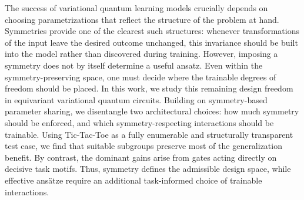 The success of variational quantum learning models crucially depends on choosing parametrizations that reflect the structure of the problem at hand. Symmetries provide one of the clearest such structures: whenever transformations of the input leave the desired outcome unchanged, this invariance should be built into the model rather than discovered during training. However, imposing a symmetry does not by itself determine a useful ansatz. Even within the symmetry-preserving space, one must decide where the trainable degrees of freedom should be placed. In this work, we study this remaining design freedom in equivariant variational quantum circuits. Building on symmetry-based parameter sharing, we disentangle two architectural choices: how much symmetry should be enforced, and which symmetry-respecting interactions should be trainable. Using Tic-Tac-Toe as a fully enumerable and structurally transparent test case, we find that suitable subgroups preserve most of the generalization benefit. By contrast, the dominant gains arise from gates acting directly on decisive task motifs. Thus, symmetry defines the admissible design space, while effective ans\"atze require an additional task-informed choice of trainable interactions.
